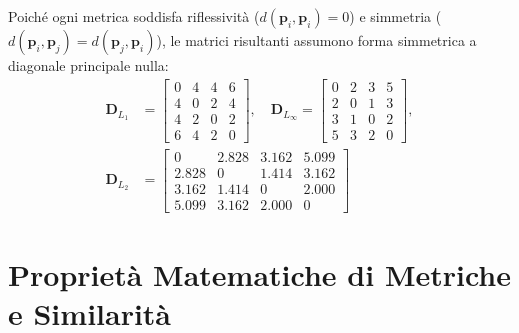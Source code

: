 Poiché ogni metrica soddisfa riflessività ($d(\mathbf{p}_i, \mathbf{p}_i) = 0$) e simmetria ($d(\mathbf{p}_i, \mathbf{p}_j) = d(\mathbf{p}_j, \mathbf{p}_i)$), le matrici risultanti assumono forma simmetrica a diagonale principale nulla:
\begin{align}
\mathbf{D}_{L_1} &= \begin{bmatrix}
0 & 4 & 4 & 6 \\
4 & 0 & 2 & 4 \\
4 & 2 & 0 & 2 \\
6 & 4 & 2 & 0
\end{bmatrix}, \quad
\mathbf{D}_{L_\infty} = \begin{bmatrix}
0 & 2 & 3 & 5 \\
2 & 0 & 1 & 3 \\
3 & 1 & 0 & 2 \\
5 & 3 & 2 & 0
\end{bmatrix}, \\[6pt]
\mathbf{D}_{L_2} &= \begin{bmatrix}
0 & 2.828 & 3.162 & 5.099 \\
2.828 & 0 & 1.414 & 3.162 \\
3.162 & 1.414 & 0 & 2.000 \\
5.099 & 3.162 & 2.000 & 0
\end{bmatrix}
\end{align}

\section{Proprietà Matematiche di Metriche e Similarità}
\label{sec:dm-metric-axioms}

